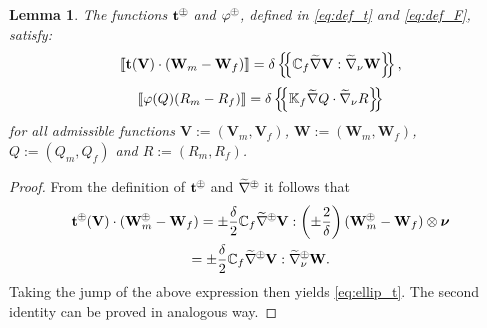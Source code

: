 \documentclass[a4paper]{article}
\newtheorem{lemma}[theorem]{Lemma}
\numberwithin{equation}{section}
\def\agrad{\widetilde\nabla}
\def\avg#1{\left\{\mskip-5mu\left\{#1\right\}\mskip-5mu\right\}}
\def\CC{\tn C}
\def\jmp#1{\left\llbracket #1 \right\rrbracket}
\def\nnu{\boldsymbol\nu}
\def\tn#1{{\mathbb{#1}}}    %
\def\ttraction{\vc t}
\def\V{\vc V}
\def\vc#1{\mathbf{#1}}     %
\newcommand{\opm}{
  {\mathbin{
    \mathchoice
      {\buildcirclepm{\displaystyle     }{0.14ex}{0.95}{0.05ex}{.7}}
      {\buildcirclepm{\textstyle        }{0.14ex}{0.95}{0.05ex}{.7}}
      {\buildcirclepm{\scriptstyle      }{0.13ex}{0.955}{0.04ex}{.55}}
      {\buildcirclepm{\scriptscriptstyle}{0.08ex}{0.95}{0.03ex}{.45}}
  }} 
}
\newcommand\buildcirclepm[5]{%
  \begin{tikzpicture}[baseline=(X.base), inner sep=-#5, outer sep=-.65]
    \node[draw,circle,line width=#4] (X)  {\footnotesize\raisebox{#2}{\scalebox{#3}{$#1\pm$}}};
  \end{tikzpicture}%
}
\newcommand{\eq}[1]{\begin{equation}#1\end{equation}}
\newcommand{\mls}[1]{\begin{multline*}#1\end{multline*}}
\begin{document}
\begin{lemma}
The functions $\ttraction^\opm$ and $\varphi^\opm$, defined in \eqref{eq:def_t} and \eqref{eq:def_F}, satisfy:
\eq{ \label{eq:ellip_t} \jmp{\ttraction(\V)\cdot(\vc W_m-\vc W_f)} = \delta\avg{\CC_f\agrad\V:\agrad_\nu{\vc W}}, }
\eq{ \label{eq:ellip_phi} \jmp{\varphi(Q)(R_m-R_f)} = \delta\avg{\tn K_f\agrad Q\cdot\agrad_\nu R} }
for all admissible functions $\V:=(\V_m,\V_f)$, $\vc W:=(\vc W_m,\vc W_f)$, $Q:=(Q_m,Q_f)$ and $R:=(R_m,R_f)$.
\end{lemma}
\begin{proof}
From the definition of $\ttraction^\opm$ and $\agrad^\opm$ it follows that
\mls{ \ttraction^\opm(\V)\cdot(\vc W_m^\opm-\vc W_f)
= \pm\frac\delta2\CC_f\agrad^\opm\V:\left(\pm\frac2\delta\right)(\vc W_m^\opm-\vc W_f)\otimes\nnu\\
= \pm\frac\delta2\CC_f\agrad^\opm\V:\agrad_\nu^\opm\vc W. }
Taking the jump of the above expression then yields \eqref{eq:ellip_t}.
The second identity can be proved in analogous way.
\end{proof}
\end{document}
